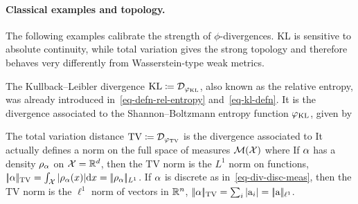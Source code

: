 \paragraph{Classical examples and topology.}

The following examples calibrate the strength of $\phi$-divergences. KL is sensitive to absolute continuity, while total variation gives the strong topology and therefore behaves very differently from Wasserstein-type weak metrics.

\begin{example}
\label{ex_KLdiv}
The Kullback--Leibler divergence $\operatorname{KL} \coloneqq \mathcal{D}_{\varphi_{\operatorname{KL}}}$, also known as the relative entropy, was already introduced in~\eqref{eq-defn-rel-entropy} and~\eqref{eq-kl-defn}. It is the divergence associated to the Shannon--Boltzmann entropy function $\varphi_{\operatorname{KL}}$, given by
\end{example}

\begin{example}\label{exmp-tv}
The total variation distance $\operatorname{TV} \coloneqq \mathcal{D}_{\varphi_{\operatorname{TV}}}$ is the divergence associated to
It actually defines a norm on the full space of measures $\mathcal{M}(\mathcal{X})$ where
If $\alpha$ has a density $\rho_{\alpha}$ on $\mathcal{X}=\mathbb{R}^d$, then the TV norm is the $L^1$ norm on functions, $|\!| \alpha |\!|_{\operatorname{TV}} = \int_{\mathcal{X}} |\rho_{\alpha}(x)| \mathrm{d} x = |\!| \rho_{\alpha} |\!|_{L^1}$.
%
If $\alpha$ is discrete as in~\eqref{eq-div-disc-meas}, then the TV norm is the $\ell^1$ norm of vectors in $\mathbb{R}^n$, $|\!| \alpha |\!|_{\operatorname{TV}}=\sum_i |\mathrm{a}_i| = |\!| \mathrm{a} |\!|_{\ell^1}$.
\end{example}

